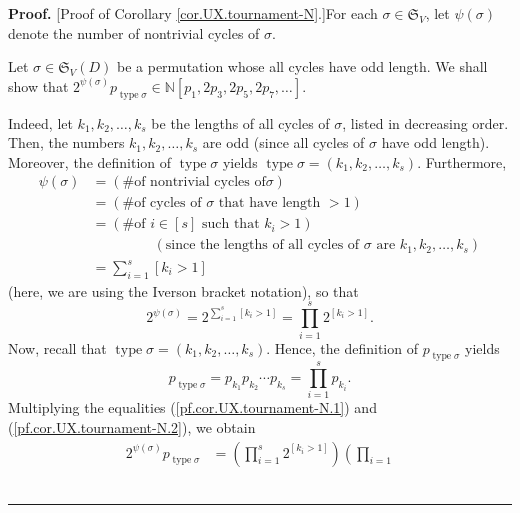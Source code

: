 \documentclass[numbers=enddot,12pt,final,onecolumn,notitlepage]{scrartcl}%
\numberwithin{exer}{section}
\theoremstyle{definition}
\newenvironment{proof}[1][Proof]{\noindent\textbf{#1.} }{\ \rule{0.5em}{0.5em}}
\let\sumnonlimits\sum
\let\prodnonlimits\prod
\renewcommand{\sum}{\sumnonlimits\limits}
\renewcommand{\prod}{\prodnonlimits\limits}
\begin{document}
\begin{proof}
[Proof of Corollary \ref{cor.UX.tournament-N}.]For each $\sigma\in
\mathfrak{S}_{V}$, let $\psi\left(  \sigma\right)  $ denote the number of
nontrivial cycles of $\sigma$.

Let $\sigma\in\mathfrak{S}_{V}\left(  D\right)  $ be a permutation whose all
cycles have odd length. We shall show that $2^{\psi\left(  \sigma\right)
}p_{\operatorname*{type}\sigma}\in\mathbb{N}\left[  p_{1},2p_{3},2p_{5}%
,2p_{7},\ldots\right]  $.

Indeed, let $k_{1},k_{2},\ldots,k_{s}$ be the lengths of all cycles of
$\sigma$, listed in decreasing order. Then, the numbers $k_{1},k_{2}%
,\ldots,k_{s}$ are odd (since all cycles of $\sigma$ have odd length).
Moreover, the definition of $\operatorname*{type}\sigma$ yields
$\operatorname*{type}\sigma=\left(  k_{1},k_{2},\ldots,k_{s}\right)  $.
Furthermore,
\begin{align*}
\psi\left(  \sigma\right)   &  =\left(  \text{\# of nontrivial cycles of
}\sigma\right) \\
&  =\left(  \text{\# of cycles of }\sigma\text{ that have length }>1\right) \\
&  =\left(  \text{\# of }i\in\left[  s\right]  \text{ such that }%
k_{i}>1\right) \\
&  \ \ \ \ \ \ \ \ \ \ \ \ \ \ \ \ \ \ \ \ \left(  \text{since the lengths of
all cycles of }\sigma\text{ are }k_{1},k_{2},\ldots,k_{s}\right) \\
&  =\sum_{i=1}^{s}\left[  k_{i}>1\right]
\end{align*}
(here, we are using the Iverson bracket notation), so that%
\begin{equation}
2^{\psi\left(  \sigma\right)  }=2^{\sum_{i=1}^{s}\left[  k_{i}>1\right]
}=\prod_{i=1}^{s}2^{\left[  k_{i}>1\right]  }.
\label{pf.cor.UX.tournament-N.1}%
\end{equation}
Now, recall that $\operatorname*{type}\sigma=\left(  k_{1},k_{2},\ldots
,k_{s}\right)  $. Hence, the definition of $p_{\operatorname*{type}\sigma}$
yields
\begin{equation}
p_{\operatorname*{type}\sigma}=p_{k_{1}}p_{k_{2}}\cdots p_{k_{s}}=\prod
_{i=1}^{s}p_{k_{i}}. \label{pf.cor.UX.tournament-N.2}%
\end{equation}
Multiplying the equalities (\ref{pf.cor.UX.tournament-N.1}) and
(\ref{pf.cor.UX.tournament-N.2}), we obtain
\begin{align}
2^{\psi\left(  \sigma\right)  }p_{\operatorname*{type}\sigma}  &  =\left(
\prod_{i=1}^{s}2^{\left[  k_{i}>1\right]  }\right)  \left(  \prod_{i=1}%

\end{align}
\end{proof}
\end{document}
